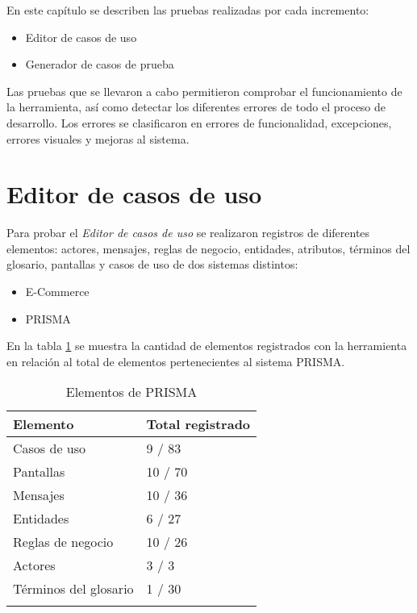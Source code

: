 En este capítulo se describen las pruebas realizadas por cada incremento:
\begin{itemize}
 \item Editor de casos de uso
 \item Generador de casos de prueba 
\end{itemize}

Las pruebas que se llevaron a cabo permitieron comprobar el funcionamiento de la herramienta, así como detectar los diferentes errores de todo el proceso de desarrollo. 
Los errores se clasificaron en errores de funcionalidad, excepciones, errores visuales y mejoras al sistema.\\

\clearpage 

\section{Editor de casos de uso}

Para probar el {\it Editor de casos de uso} se realizaron registros de diferentes elementos: actores, mensajes, reglas de negocio, entidades, atributos, términos del glosario, pantallas y casos de uso de
dos sistemas distintos:

\begin{itemize}
 \item E-Commerce
 \item PRISMA
\end{itemize}

En la tabla \ref{tabla:vectorEditor} se muestra la cantidad de elementos registrados con la herramienta en relación al total de elementos pertenecientes al sistema PRISMA.

\begin{longtable}{| p{} | p{} |}%
	\arrayrulecolor{black}%
	\rowcolor{black}%
	{\color{white}Elemento} & {\color{white}Total registrado}\\ \hline
	\endhead%
	\arrayrulecolor{black}%
	Casos de uso & 9 / 83 \\ \hline
	Pantallas & 10 / 70 \\ \hline
	Mensajes & 10 / 36 \\ \hline
	Entidades & 6 / 27 \\ \hline
	Reglas de negocio & 10 / 26 \\ \hline
	Actores & 3 / 3 \\ \hline
	Términos del glosario  & 1 / 30 \\ \hline
	\caption{Elementos de PRISMA}\label{tabla:vectorEditor}
\end{longtable}%

